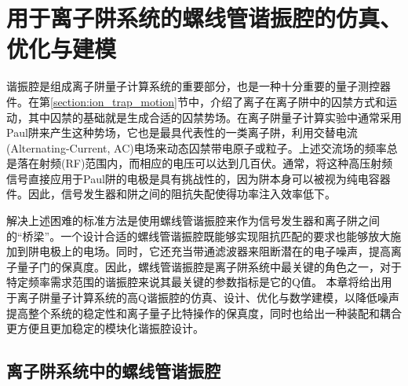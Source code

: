 
\chapter[用于离子阱系统的高Q螺线管谐振腔的仿真、优化与建模]{用于离子阱系统的螺线管谐振腔的仿真、优化与建模\label{section:helical}}
谐振腔是组成离子阱量子计算系统的重要部分，也是一种十分重要的量子测控器件。在第\ref{section:ion_trap_motion}节中，介绍了离子在离子阱中的囚禁方式和运动，其中囚禁的基础就是生成合适的囚禁势场。在离子阱量子计算实验中通常采用Paul阱来产生这种势场，它也是最具代表性的一类离子阱，利用交替电流(Alternating-Current, AC)电场来动态囚禁带电原子或粒子。上述交流场的频率总是落在射频(RF)范围内，而相应的电压可以达到几百伏。通常，将这种高压射频信号直接应用于Paul阱的电极是具有挑战性的，因为阱本身可以被视为纯电容器件。因此，信号发生器和阱之间的阻抗失配使得功率注入效率低下。

解决上述困难的标准方法是使用螺线管谐振腔来作为信号发生器和离子阱之间的“桥梁”。一个设计合适的螺线管谐振腔既能够实现阻抗匹配的要求也能够放大施加到阱电极上的电场。同时，它还充当带通滤波器来阻断潜在的电子噪声，提高离子量子门的保真度。因此，螺线管谐振腔是离子阱系统中最关键的角色之一，对于特定频率需求范围的谐振腔来说其最关键的参数指标是它的Q值。
本章将给出用于离子阱量子计算系统的高Q谐振腔的仿真、设计、优化与数学建模，以降低噪声提高整个系统的稳定性和离子量子比特操作的保真度\cite[]{van_Dijk_Kawakami_Schouten_Veldhorst_Vandersypen_Babaie_Charbon_Sebastiano_2019}，同时也给出一种装配和耦合更方便且更加稳定的模块化谐振腔设计。




\section[离子阱系统中的螺线管谐振腔]{离子阱系统中的螺线管谐振腔}



